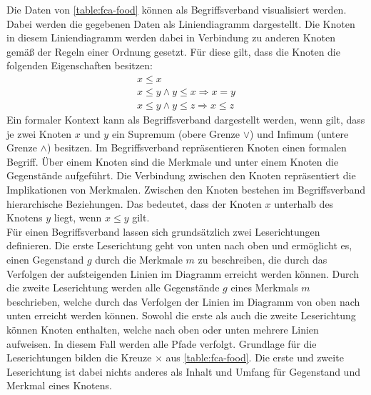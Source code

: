 Die Daten von \autoref{table:fca-food} können als Begriffsverband visualisiert werden.
Dabei werden die gegebenen Daten als Liniendiagramm dargestellt.
Die Knoten in diesem Liniendiagramm werden dabei in Verbindung zu anderen Knoten gemäß der Regeln einer Ordnung gesetzt.
Für diese gilt, dass die Knoten die folgenden Eigenschaften besitzen:
\begin{align}
    x \leq x \tag{reflexiv}                                       \\
    x \leq y \land y \leq x \Rightarrow x=y \tag{antisymmetrisch} \\
    x \leq y \land y \leq z \Rightarrow x\leq z \tag{transitiv}
\end{align}
Ein formaler Kontext kann als Begriffsverband dargestellt werden, wenn gilt, dass je zwei Knoten $x$ und $y$ ein Supremum (obere Grenze $\lor$) und Infimum (untere Grenze $\land$) besitzen.
Im Begriffsverband repräsentieren Knoten einen formalen Begriff.
Über einem Knoten sind die Merkmale und unter einem Knoten die Gegenstände aufgeführt.
Die Verbindung zwischen den Knoten repräsentiert die Implikationen von Merkmalen.
Zwischen den Knoten bestehen im Begriffsverband hierarchische Beziehungen.
Das bedeutet, dass der Knoten $x$ unterhalb des Knotens $y$ liegt, wenn $x \leq y$ gilt.\\

Für einen Begriffsverband lassen sich grundsätzlich zwei Leserichtungen definieren.
Die erste Leserichtung geht von unten nach oben und ermöglicht es, einen Gegenstand $g$ durch die Merkmale $m$ zu beschreiben, die durch das Verfolgen der aufsteigenden Linien im Diagramm erreicht werden können.
Durch die zweite Leserichtung werden alle Gegenstände $g$ eines Merkmals $m$ beschrieben, welche durch das Verfolgen der Linien im Diagramm von oben nach unten erreicht werden können.
Sowohl die erste als auch die zweite Leserichtung können Knoten enthalten, welche nach oben oder unten mehrere Linien aufweisen.
In diesem Fall werden alle Pfade verfolgt.
Grundlage für die Leserichtungen bilden die Kreuze $\times$ aus \autoref{table:fca-food}.
Die erste und zweite Leserichtung ist dabei nichts anderes als Inhalt und Umfang für Gegenstand und Merkmal eines Knotens. \\

